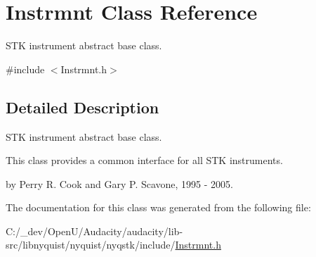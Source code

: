 \hypertarget{class_instrmnt}{}\section{Instrmnt Class Reference}
\label{class_instrmnt}


S\+TK instrument abstract base class.  




{\ttfamily \#include $<$Instrmnt.\+h$>$}



\subsection{Detailed Description}
S\+TK instrument abstract base class. 

This class provides a common interface for all S\+TK instruments.

by Perry R. Cook and Gary P. Scavone, 1995 -\/ 2005. 

The documentation for this class was generated from the following file\+:\begin{DoxyCompactItemize}
\item 
C\+:/\+\_\+dev/\+Open\+U/\+Audacity/audacity/lib-\/src/libnyquist/nyquist/nyqstk/include/\hyperlink{_instrmnt_8h}{Instrmnt.\+h}\end{DoxyCompactItemize}

